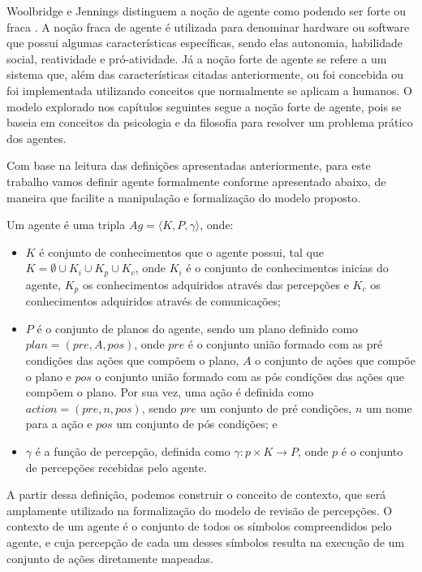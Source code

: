 Woolbridge e Jennings distinguem a noção de agente como podendo ser forte ou fraca \cite{wooldridge1995intelligent}. A noção fraca de agente é utilizada para denominar hardware ou software que possui algumas características específicas, sendo elas autonomia, habilidade social, reatividade e pró-atividade. Já a noção forte de agente se refere a um sistema que, além das características citadas anteriormente, ou foi concebida ou foi implementada utilizando conceitos que normalmente se aplicam a humanos. O modelo explorado nos capítulos seguintes segue a noção forte de agente, pois se baseia em conceitos da psicologia e da filosofia para resolver um problema prático dos agentes.

Com base na leitura das definições apresentadas anteriormente, para este trabalho vamos definir agente formalmente conforme apresentado abaixo, de maneira que facilite a manipulação e formalização do modelo proposto.

\theoremstyle{definition}
\begin{definition}
    \label{def:agent}
    Um agente é uma tripla $Ag = \langle K, P, \gamma \rangle$, onde:
    \begin{itemize}
        \item $K$ é conjunto de conhecimentos que o agente possui, tal que $K = \emptyset \cup K_i \cup K_p \cup K_c$, onde $K_i$ é o conjunto de conhecimentos inicias do agente, $K_p$ os conhecimentos adquiridos através das percepções e $K_c$ os conhecimentos adquiridos através de comunicações;
        \item $P$ é o conjunto de planos do agente, sendo um plano definido como $plan = (pre, A, pos)$, onde $pre$ é o conjunto união formado com as pré condições das ações que compõem o plano, $A$ o conjunto de ações que compõe o plano e $pos$ o conjunto união formado com as pós condições das ações que compõem o plano. Por sua vez, uma ação é definida como $action = (pre, n, pos)$, sendo $pre$ um conjunto de pré condições, $n$ um nome para a ação e $pos$ um conjunto de pós condições; e
        \item $\gamma$ é a função de percepção, definida como $ \gamma: p \times K \rightarrow P $, onde $p$ é o conjunto de percepções recebidas pelo agente.
    \end{itemize}{}
\end{definition}{}

A partir dessa definição, podemos construir o conceito de contexto, que será amplamente utilizado na formalização do modelo de revisão de percepções. O contexto de um agente é o conjunto de todos os símbolos compreendidos pelo agente, e cuja percepção de cada um desses símbolos resulta na execução de um conjunto de ações diretamente mapeadas.

